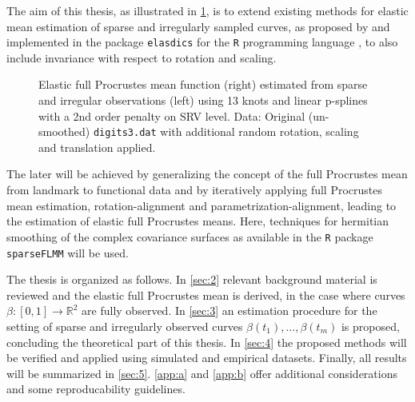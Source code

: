 The aim of this thesis, as illustrated in \cref{fig:1-mean}, is to extend existing methods for elastic mean estimation of sparse and irregularly sampled curves, as proposed by \cite{Steyer2021} and implemented in the package \texttt{elasdics} \parencite{elasdics} for the \texttt{R} programming language \parencite{R}, to also include invariance with respect to rotation and scaling.
\begin{figure}
  \centering
  \begin{subfigure}{.48\textwidth}
    \centering
  \end{subfigure}\hfill%
  \begin{subfigure}{.48\textwidth}
    \centering
  \end{subfigure}
  \caption{Elastic full Procrustes mean function (right) estimated from sparse and irregular observations (left) using 13 knots and linear p-splines with a 2nd order penalty on SRV level. Data: Original (un-smoothed) \texttt{digits3.dat} with additional random rotation, scaling and translation applied.}
  \label{fig:1-mean}
\end{figure}
The later will be achieved by generalizing the concept of the full Procrustes mean from landmark to functional data and by iteratively applying full Procrustes mean estimation, rotation-alignment and parametrization-alignment, leading to the estimation of elastic full Procrustes means.
Here, techniques for hermitian smoothing of the complex covariance surfaces as available in the \texttt{R} package \texttt{sparseFLMM} \parencite{sparseFLMM} will be used.


The thesis is organized as follows.
In \cref{sec:2} relevant background material is reviewed and the elastic full Procrustes mean is derived, in the case where curves $\beta:[0,1] \rightarrow \mathbb{R}^2$ are fully observed. 
In \cref{sec:3} an estimation procedure for the setting of sparse and irregularly observed curves $\beta(t_1), \dots, \beta(t_m)$ is proposed, concluding the theoretical part of this thesis.
In \cref{sec:4} the proposed methods will be verified and applied using simulated and empirical datasets.
Finally, all results will be summarized in \cref{sec:5}.
\cref{app:a} and \cref{app:b} offer additional considerations and some reproducability guidelines.

